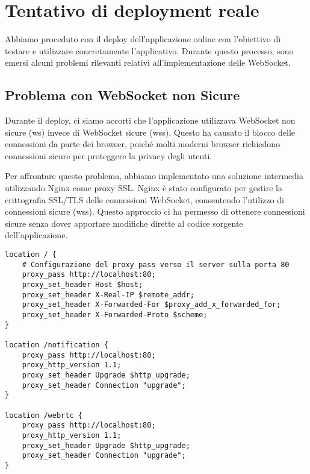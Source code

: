 \section{Tentativo di deployment reale}

Abbiamo proceduto con il deploy dell'applicazione online con l'obiettivo di testare e utilizzare concretamente l'applicativo. Durante questo processo, sono emersi alcuni problemi rilevanti relativi all'implementazione delle WebSocket.

\subsection{Problema con WebSocket non Sicure}
Durante il deploy, ci siamo accorti che l'applicazione utilizzava WebSocket non sicure (ws) invece di WebSocket sicure (wss). Questo ha causato il blocco delle connessioni da parte dei browser, poiché molti moderni browser richiedono connessioni sicure per proteggere la privacy degli utenti.

Per affrontare questo problema, abbiamo implementato una soluzione intermedia utilizzando Nginx come proxy SSL. Nginx è stato configurato per gestire la crittografia SSL/TLS delle connessioni WebSocket, consentendo l'utilizzo di connessioni sicure (wss). Questo approccio ci ha permesso di ottenere connessioni sicure senza dover apportare modifiche dirette al codice sorgente dell'applicazione. 

\begin{verbatim}
location / {
    # Configurazione del proxy pass verso il server sulla porta 80
    proxy_pass http://localhost:80;
    proxy_set_header Host $host;
    proxy_set_header X-Real-IP $remote_addr;
    proxy_set_header X-Forwarded-For $proxy_add_x_forwarded_for;
    proxy_set_header X-Forwarded-Proto $scheme;
}

location /notification {
    proxy_pass http://localhost:80;
    proxy_http_version 1.1;
    proxy_set_header Upgrade $http_upgrade;
    proxy_set_header Connection "upgrade";
}

location /webrtc {
    proxy_pass http://localhost:80;
    proxy_http_version 1.1;
    proxy_set_header Upgrade $http_upgrade;
    proxy_set_header Connection "upgrade";
}
\end{verbatim}
